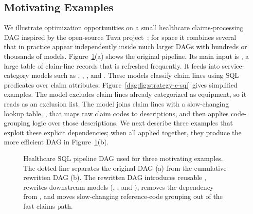 \subsection{Motivating Examples}
\label{dag:sec:motivating-examples}


We illustrate optimization opportunities on a small healthcare claims-processing DAG inspired by the open-source Tuva project~\cite{tuvaProject}; for space it combines several that in practice appear independently inside much larger DAGs with hundreds or thousands of models. Figure~\ref{dag:fig:strategy-c-graph}(a) shows the original pipeline.
Its main input is , a large table of claim-line records that is refreshed frequently. It feeds into 
service-category models such as , , , and . These models classify claim lines using SQL predicates over claim attributes; Figure~\ref{dag:fig:strategy-c-sql} gives simplified examples. The  model excludes claim lines already categorized as equipment, so it reads  as an exclusion list. The  model joins claim lines with a 
slow-changing lookup table, , that maps raw claim codes to descriptions, and then applies code-grouping logic over those descriptions. We next describe three examples that exploit these explicit dependencies; when all applied together, they produce the more efficient DAG in Figure~\ref{dag:fig:strategy-c-graph}(b).

\begin{figure}[t]
\inv
\centering
{ }
\inv
\caption{Healthcare SQL pipeline DAG used for three motivating examples. The dotted line separates the original DAG (a) from the cumulative rewritten DAG (b). The rewritten DAG introduces reusable , rewrites downstream models (, , and ), removes the  dependency from , and moves slow-changing reference-code grouping out of the fast claims path. }
\label{dag:fig:strategy-c-graph}
\end{figure}

